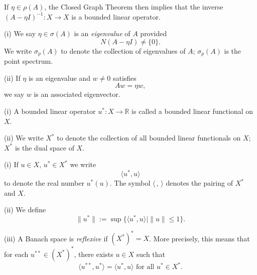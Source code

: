 \begin{remark}
\label{rem:resolvent-inverse-bounded}
If $\eta \in \rho(A)$, the Closed Graph Theorem then implies that the inverse $(A - \eta I)^{-1} : X \to X$ is a bounded linear operator.
\end{remark}

\begin{definition}
\label{def:eigenvalue-eigenvector-appendix-d}
(i) We say $\eta \in \sigma(A)$ is an \textit{eigenvalue} of $A$ provided
$$N(A - \eta I) \neq \{0\}.$$
We write $\sigma_p(A)$ to denote the collection of eigenvalues of $A$; $\sigma_p(A)$ is the point spectrum.

(ii) If $\eta$ is an eigenvalue and $w \neq 0$ satisfies
$$Aw = \eta w,$$
we say $w$ is an associated eigenvector.
\end{definition}

\begin{definition}
\label{def:bounded-linear-functional-dual-space}
(i) A bounded linear operator $u^* : X \to \mathbb{R}$ is called a bounded linear functional on $X$.

(ii) We write $X^*$ to denote the collection of all bounded linear functionals on $X$; $X^*$ is the dual space of $X$.
\end{definition}

\begin{definition}
\label{def:dual-pairing-reflexive-banach-space}
(i) If $u \in X$, $u^* \in X^*$ we write
$$\langle u^*, u \rangle$$
to denote the real number $u^*(u)$. The symbol $\langle \, , \, \rangle$ denotes the pairing of $X^*$ and $X$.

(ii) We define
$$\|u^*\| := \sup\{\langle u^*, u \rangle \mid \|u\| \leq 1\}.$$

(iii) A Banach space is \textit{reflexive} if $(X^*)^* = X$. More precisely, this means that for each $u^{**} \in (X^*)^*$, there exists $u \in X$ such that
$$\langle u^{**}, u^* \rangle = \langle u^*, u \rangle \text{ for all } u^* \in X^*.$$
\end{definition}

